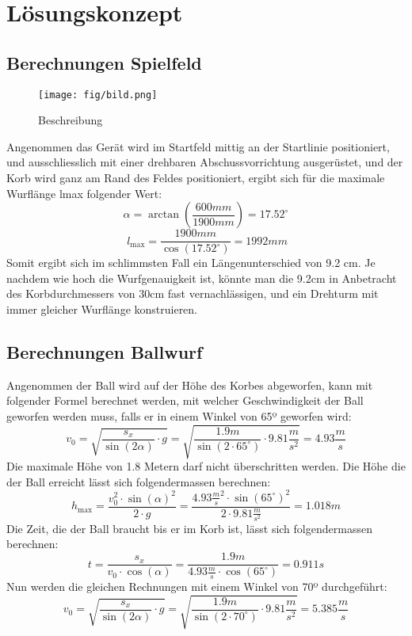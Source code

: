 \section{Lösungskonzept}

\subsection{Berechnungen Spielfeld}
\begin{figure}[h!]          %
    \centering              %

    \texttt{[image: fig/bild.png]}
    
    \caption{Beschreibung}  %
    
    \label{fig:bild}        %
\end{figure}
\noindent
Angenommen das Gerät wird im Startfeld mittig an der Startlinie positioniert, 
und ausschliesslich mit einer drehbaren Abschussvorrichtung ausgerüstet, und 
der Korb wird ganz am Rand des Feldes positioniert, ergibt sich für die 
maximale Wurflänge lmax folgender Wert: 
% 
\[ \alpha = \arctan( \frac{600mm}{1900mm}) = 17.52^\circ \]
\[\ l_\text{max} = \frac{1900mm}{\cos( 17.52^\circ)} = 1992mm \]
%
Somit ergibt sich im schlimmsten Fall ein Längenunterschied von 9.2 cm. Je 
nachdem wie hoch die Wurfgenauigkeit ist, könnte man die 9.2cm in Anbetracht 
des Korbdurchmessers von 30cm fast vernachlässigen, und ein Drehturm mit immer 
gleicher Wurflänge konstruieren.

\subsection{Berechnungen Ballwurf}
Angenommen der Ball wird auf der Höhe des Korbes abgeworfen, kann mit 
folgender Formel berechnet werden, mit welcher Geschwindigkeit der Ball 
geworfen werden muss, falls er in einem Winkel von 65º geworfen wird:
%
\[ v_0 
= \sqrt{ \frac{s_x}{\sin(2\alpha)} \cdot g } 
= \sqrt{ \frac{1.9m}{\sin(2 \cdot 65^\circ)} \cdot 9.81 \frac{m}{s^2}} 
= 4.93 \frac{m}{s} \]
%
Die maximale Höhe von 1.8 Metern darf nicht überschritten werden. Die Höhe die 
der Ball erreicht lässt sich folgendermassen berechnen:
%
\[ h_\text{max} 
= \frac{v_0^2 \cdot \sin(\alpha)^2}{2 \cdot g} 
= \frac{4.93 \frac{m}{s}^2 \cdot \sin(65^\circ)^2}{2 \cdot 9.81 \frac{m}{s^2}} 
= 1.018m \]
%
Die Zeit, die der Ball braucht bis er im Korb ist, lässt sich folgendermassen 
berechnen:
%
\[ t = \frac{s_x}{v_0 \cdot \cos(\alpha)} 
= \frac{1.9m}{4.93 \frac{m}{s} \cdot \cos(65^\circ)} = 0.911s \]
%
Nun werden die gleichen Rechnungen mit einem Winkel von 70º durchgeführt:
%
\[ v_0 = \sqrt{ \frac{s_x}{\sin(2\alpha)} \cdot g } 
= \sqrt{ \frac{1.9m}{\sin(2 \cdot 70^\circ)} \cdot 9.81 \frac{m}{s^2}} 
= 5.385 \frac{m}{s} \]

